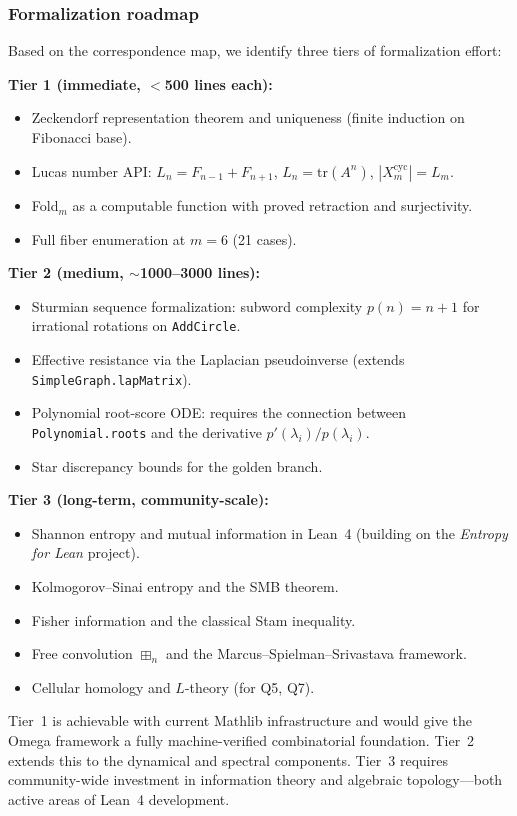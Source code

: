 \subsubsection*{Formalization roadmap}

Based on the correspondence map, we identify three tiers
of formalization effort:

\medskip\noindent
\textbf{Tier 1 (immediate, $<$500 lines each):}
\begin{itemize}[nosep]
\item Zeckendorf representation theorem and uniqueness
  (finite induction on Fibonacci base).
\item Lucas number API: $L_n=F_{n-1}+F_{n+1}$, $L_n=\mathrm{tr}(A^n)$,
  $|X_m^{\mathrm{cyc}}|=L_m$.
\item Fold$_m$ as a computable function with proved retraction
  and surjectivity.
\item Full fiber enumeration at $m=6$ (21 cases).
\end{itemize}

\medskip\noindent
\textbf{Tier 2 (medium, $\sim$1000--3000 lines):}
\begin{itemize}[nosep]
\item Sturmian sequence formalization: subword complexity $p(n)=n+1$
  for irrational rotations on \texttt{AddCircle}.
\item Effective resistance via the Laplacian pseudoinverse
  (extends \texttt{SimpleGraph.lapMatrix}).
\item Polynomial root-score ODE: requires the connection between
  \texttt{Polynomial.roots} and the derivative $p'(\lambda_i)/p(\lambda_i)$.
\item Star discrepancy bounds for the golden branch.
\end{itemize}

\medskip\noindent
\textbf{Tier 3 (long-term, community-scale):}
\begin{itemize}[nosep]
\item Shannon entropy and mutual information in Lean~4
  (building on the \emph{Entropy for Lean} project).
\item Kolmogorov--Sinai entropy and the SMB theorem.
\item Fisher information and the classical Stam inequality.
\item Free convolution $\boxplus_n$ and the Marcus--Spielman--Srivastava
  framework.
\item Cellular homology and $L$-theory (for Q5, Q7).
\end{itemize}

\noindent
Tier~1 is achievable with current Mathlib infrastructure and
would give the Omega framework a fully machine-verified
combinatorial foundation.  Tier~2 extends this to the dynamical
and spectral components.  Tier~3 requires community-wide
investment in information theory and algebraic topology---both
active areas of Lean~4 development.
